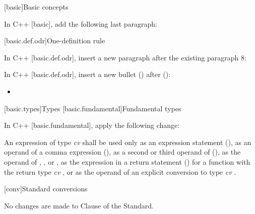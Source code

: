 
[basic]{Basic concepts}

\pnum
In C++ [basic], add the following last paragraph:

\begin{std.txt}
\end{std.txt}



\setcounter{section}{1}
[basic.def.odr]{One-definition rule}

\pnum
In C++ [basic.def.odr], insert a new paragraph after the existing paragraph 8:

\begin{std.txt}
\end{std.txt}

\pnum
In C++ [basic.def.odr], insert a new bullet
() after
():
\begin{std.txt}
\begin{itemize}
\item {}
\end{itemize}
\end{std.txt}

\setcounter{section}{6}
[basic.types]{Types}
[basic.fundamental]{Fundamental types}

\pnum
In C++ [basic.fundamental], apply the following change:

\begin{std.txt}
An expression of type \emph{cv}  shall be used only as an expression
statement (), as an operand of a comma expression
(), as a second or
third operand of  (), as the operand of ,
,  or , as the
expression in a return statement () for a function with the return type
\emph{cv} , or as the operand of an explicit conversion to type
\emph{cv} .
\end{std.txt}

[conv]{Standard conversions}

No changes are made to Clause \the\value{chapter} of the \Cpp Standard.
